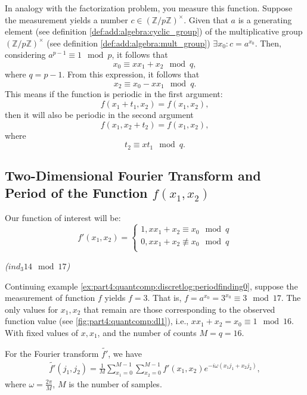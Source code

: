 In analogy with the factorization problem, you measure this function. Suppose the measurement yields a number $c \in \left(\mathbb{Z}/p\mathbb{Z}\right)^\times$. Given that $a$ is a generating element (see definition \ref{def:add:algebra:cyclic_group}) of the multiplicative group $\left(\mathbb{Z}/p\mathbb{Z}\right)^\times$ (see definition \ref{def:add:algebra:mult_group}) $\exists x_0: c = a^{x_0}$. Then, considering  $a^{p-1} \equiv 1 \mod p$, it follows that
\[
x_0 \equiv x x_1 + x_2 \mod q,
\] 
where $q = p - 1$. From this expression, it follows that
\[
x_2 \equiv x_0 - x x_1 \mod q.
\]
This means if the function is periodic in the first argument:
\[
f(x_1 + t_1, x_2) = f(x_1,x_2),
\]
then it will also be periodic in the second argument
\[
f(x_1, x_2 + t_2) = f(x_1,x_2),
\]
where 
\begin{equation}
t_2 \equiv x t_1 \mod q.
\label{eq:part4:quantcomp:discretlogeq}
\end{equation}

\subsection{Two-Dimensional Fourier Transform and Period of the Function $f(x_1, x_2)$}
Our function of interest will be:
\begin{equation}
\label{eq:part4:quantcomp:shordiscretlog:fprime}
f'\left(x_1, x_2\right) = 
\begin{cases}
1, x x_1 + x_2 \equiv x_0 \mod q \\
0, x x_1 + x_2 \not\equiv x_0 \mod q \\
\end{cases}
\end{equation}
\begin{example}
\emph{($ind_3{14} \mod{17}$)}

Continuing example \ref{ex:part4:quantcomp:discretlog:periodfinding0}, suppose the measurement of function $f$ yields $f = 3$. That is, $f = a^{x_0} = 3^{x_0} \equiv 3 \mod 17$. The only values for $x_1, x_2$ that remain are those corresponding to the observed function value (see \autoref{fig:part4:quantcomp:dl1}), i.e., $x x_1 + x_2 = x_0 \equiv 1 \mod 16$. With fixed values of $x, x_1$, and the number of counts $M = q = 16$. 
\label{ex:part4:quantcomp:discretlog:periodfinding1}
\end{example}

For the Fourier transform $\tilde{f'}$, we have 
\begin{eqnarray}
\tilde{f'}\left(j_1, j_2\right) = 
\frac{1}{M}\sum_{x_1 = 0}^{M-1}\sum_{x_2 = 0}^{M-1} 
f'\left(x_1, x_2\right)e^{-i \omega\left(x_1 j_1 + x_2j_2\right)},
\label{eq:part4:quantcomp:discretlog:ftq16_pre}
\end{eqnarray}
where $\omega = \frac{2 \pi}{M}$, $M$ is the number of samples. 

